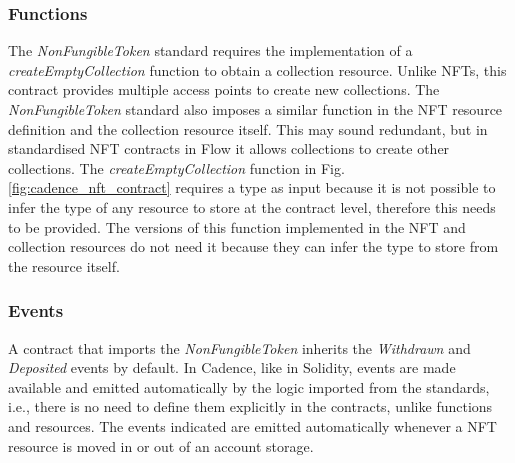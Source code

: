 \documentclass[../NFTComp_IEEE.tex]{subfiles}
\begin{document}
\subsubsection{Functions}
The \textit{NonFungibleToken} standard requires the implementation of a \textit{createEmptyCollection} function to obtain a collection resource. Unlike NFTs, this contract provides multiple access points to create new collections. The \textit{NonFungibleToken} standard also imposes a similar function in the NFT resource definition and the collection resource itself. This may sound redundant, but in standardised NFT contracts in Flow it allows collections to create other collections. The \textit{createEmptyCollection} function in Fig. \ref{fig:cadence_nft_contract} requires a type as input because it is not possible to infer the type of any resource to store at the contract level, therefore this needs to be provided. The versions of this function implemented in the NFT and collection resources do not need it because they can infer the type to store from the resource itself.

\subsubsection{Events}
A contract that imports the \textit{NonFungibleToken} inherits the \textit{Withdrawn} and \textit{Deposited} events by default. In Cadence, like in Solidity, events are made available and emitted automatically by the logic imported from the standards, i.e., there is no need to define them explicitly in the contracts, unlike functions and resources. The events indicated are emitted automatically whenever a NFT resource is moved in or out of an account storage.
\end{document}
